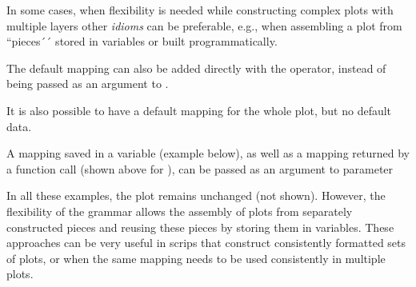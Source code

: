 \documentclass[krantz2]{krantz}\usepackage{knitr}
\begin{document}
\begin{explainbox}
In some cases, when flexibility is needed while constructing complex plots with multiple layers other \emph{idioms} can be preferable, e.g., when assembling a plot from ``pieces´´ stored in variables or built programmatically.

The default mapping can also be added directly with the \code{+} operator, instead of being passed as an argument to .

\begin{knitrout}\footnotesize
{}\color{fgcolor}\begin{kframe}
\begin{alltt}
\hlstd{(}  \hlopt{+}
       \hlstd{(}    \hlopt{+}
  \hlstd{()}
\end{alltt}
\end{kframe}
\end{knitrout}

It is also possible to have a default mapping for the whole plot, but no default data.

\begin{knitrout}\footnotesize
{}\color{fgcolor}\begin{kframe}
\begin{alltt}
\hlstd{()} \hlopt{+}
  \hlstd{(}    \hlopt{+}
  \hlstd{(} 
\end{alltt}
\end{kframe}
\end{knitrout}

A mapping saved in a variable (example below), as well as a mapping returned by a function call (shown above for ), can be passed as an argument to parameter 

\begin{knitrout}\footnotesize
{}\color{fgcolor}\begin{kframe}
\begin{alltt}
 \hlkwb{<-} \hlstd{(}   
\hlstd{(} 
         \hlopt{+}
  \hlstd{()}
\end{alltt}
\end{kframe}
\end{knitrout}

In all these examples, the plot remains unchanged (not shown). However, the flexibility of the grammar allows the assembly of plots from separately constructed pieces and reusing these pieces by storing them in variables. These approaches can be very useful in scrips that construct consistently formatted sets of plots, or when the same mapping needs to be used consistently in multiple plots.
\end{explainbox}
\end{document}
